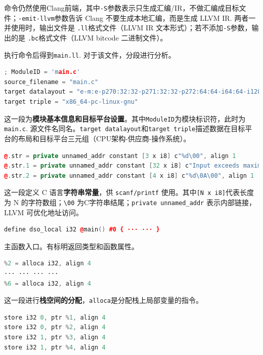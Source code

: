 \documentclass[UTF8,a4paper,10pt]{ctexart}
\begin{document}
命令仍然使用Clang前端，其中\texttt{-S}参数表示只生成汇编/IR，不做汇编成目标文件；\texttt{-emit-llvm}参数告诉 Clang 不要生成本地汇编，而是生成 LLVM IR. 两者一并使用时，输出文件是 \texttt{.ll}格式文件（LLVM IR 文本形式）；若不添加\texttt{-S}参数，输出的是 \texttt{.bc}格式文件（LLVM bitcode 二进制文件）。\label{we-talked-about-it-here}

执行命令后得到\texttt{main.ll}. 对于该文件，分段进行分析。


\begin{lstlisting}[title=main.ll 段落 1,frame=trbl,language={C++}]
; ModuleID = 'main.c'
source_filename = "main.c"
target datalayout = "e-m:e-p270:32:32-p271:32:32-p272:64:64-i64:64-i128:128-f80:128-n8:16:32:64-S128"
target triple = "x86_64-pc-linux-gnu"
\end{lstlisting}

这一段为\textbf{模块基本信息和目标平台设置}。其中\texttt{ModuleID}为模块标识符，此时为\texttt{main.c}. 源文件名同名。\texttt{target datalayout}和\texttt{target triple}描述数据在目标平台的布局和目标平台三元组（CPU架构-供应商-操作系统）。

\begin{lstlisting}[title=main.ll 段落 2,frame=trbl,language={C++}]
@.str = private unnamed_addr constant [3 x i8] c"%d\00", align 1
@.str.1 = private unnamed_addr constant [32 x i8] c"Input exceeds maximum value %d\0A\00", align 1
@.str.2 = private unnamed_addr constant [4 x i8] c"%d\0A\00", align 1
\end{lstlisting}

这一段定义 C 语言\textbf{字符串常量}，供 \texttt{scanf/printf} 使用。其中\texttt{[N x i8]}代表长度为 N 的字符数组；\texttt{\textbackslash00} 为C字符串结尾；\texttt{private unnamed\_addr} 表示内部链接，LLVM 可优化地址访问。

\begin{lstlisting}[title=main.ll 段落 3,frame=trbl,language={C++}]
define dso_local i32 @main() #0 { ··· ··· }
\end{lstlisting}

主函数入口。有标明返回类型和函数属性。

\begin{lstlisting}[title=main.ll 段落 4,frame=trbl,language={C++}]
%1 = alloca i32, align 4
%2 = alloca i32, align 4
··· ··· ··· ···
%6 = alloca i32, align 4
\end{lstlisting}

这一段进行\textbf{栈空间的分配}，\texttt{alloca}是分配栈上局部变量的指令。

\begin{lstlisting}[title=main.ll 段落 5,frame=trbl,language={C++}]
store i32 0, ptr %1, align 4
store i32 0, ptr %2, align 4
store i32 1, ptr %3, align 4
store i32 1, ptr %4, align 4
\end{lstlisting}
\end{document}
